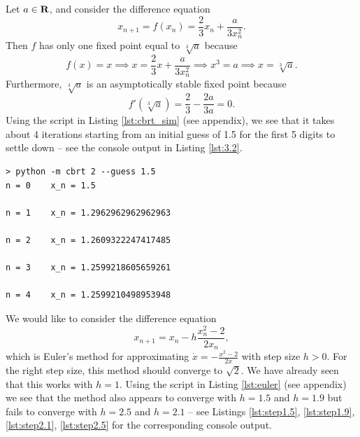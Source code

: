 \documentclass[nonumber]{homework}
\begin{document}
	\maketitle
	
	Let $a \in \textnormal{\bf R}$, and consider the difference equation
	\begin{equation*}
		x_{n+1} = f(x_n) = \frac{2}{3}x_n + \frac{a}{3x_n^2}.
	\end{equation*}
	Then $f$ has only one fixed point equal to $\sqrt[3]{a}$ because
	\begin{equation*}
		f(x) = x \implies x = \frac{2}{3}x + \frac{a}{3x_n^2} \implies x^3 = a \implies x = \sqrt[3]{a}.
	\end{equation*}
	Furthermore, $\sqrt[3]{a}$ is an asymptotically stable fixed point because
	\begin{equation*}
		f'(\sqrt[3]{a}) = \frac{2}{3} - \frac{2a}{3a} = 0. 
	\end{equation*}
	Using the script in Listing \ref{lst:cbrt_sim} (see appendix), we see that it takes about 4 iterations starting from an initial guess of 1.5 for the first 5 digits to settle down -- see the console output in Listing \ref{lst:3.2}.
	
	\begin{lstlisting}[basicstyle=\small\ttfamily, frame=single, caption={Console command and output}, label=lst:3.2]
> python -m cbrt 2 --guess 1.5
n = 0    x_n = 1.5

n = 1    x_n = 1.2962962962962963

n = 2    x_n = 1.2609322247417485

n = 3    x_n = 1.2599218605659261

n = 4    x_n = 1.2599210498953948
	\end{lstlisting}
	
	\newpage
	
	We would like to consider the difference equation
	\begin{equation*}
		x_{n+1} = x_n - h\frac{x_n^2 - 2}{2x_n},
	\end{equation*}
	which is Euler's method for approximating $\dot{x} = -\frac{x^2-2}{2x}$ with step size $h > 0$. For the right step size, this method should converge to $\sqrt{2}$. We have already seen that this works with $h = 1$. Using the script in Listing \ref{lst:euler} (see appendix) we see that the method also appears to converge with $h = 1.5$ and $h = 1.9$ but fails to converge with $h = 2.5$ and $h = 2.1$ --  see Listings \ref{lst:step1.5}, \ref{lst:step1.9}, \ref{lst:step2.1}, \ref{lst:step2.5} for the corresponding console output.
	
\end{document}
